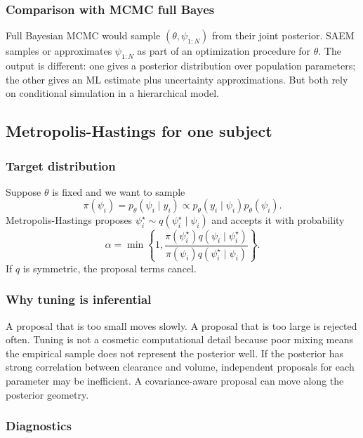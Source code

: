\subsubsection*{Comparison with MCMC full Bayes}

Full Bayesian MCMC would sample \((\theta,\psi_{1:N})\) from their joint posterior.  SAEM samples or approximates \(\psi_{1:N}\) as part of an optimization procedure for \(\theta\).  The output is different: one gives a posterior distribution over population parameters; the other gives an ML estimate plus uncertainty approximations.  But both rely on conditional simulation in a hierarchical model.

\subsection{Metropolis-Hastings for one subject}

\subsubsection*{Target distribution}

Suppose \(\theta\) is fixed and we want to sample
\[
  \pi(\psi_i)
  =
  p_\theta(\psi_i\mid y_i)
  \propto
  p_\theta(y_i\mid\psi_i)p_\theta(\psi_i).
\]
Metropolis-Hastings proposes \(\psi_i^\star\sim q(\psi_i^\star\mid\psi_i)\) and accepts it with probability
\[
  \alpha
  =
  \min\left\{
    1,
    \frac{\pi(\psi_i^\star)q(\psi_i\mid\psi_i^\star)}
         {\pi(\psi_i)q(\psi_i^\star\mid\psi_i)}
  \right\}.
\]
If \(q\) is symmetric, the proposal terms cancel.

\subsubsection*{Why tuning is inferential}

A proposal that is too small moves slowly.  A proposal that is too large is rejected often.  Tuning is not a cosmetic computational detail because poor mixing means the empirical sample does not represent the posterior well.  If the posterior has strong correlation between clearance and volume, independent proposals for each parameter may be inefficient.  A covariance-aware proposal can move along the posterior geometry.

\subsubsection*{Diagnostics}

